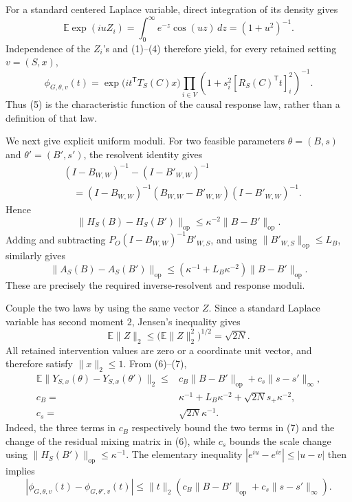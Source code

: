 For a standard centered Laplace variable, direct integration of its density
gives
\[
 \mathbb E\exp(iuZ_i)
 =\int_0^\infty e^{-z}\cos(uz)\,dz
 =(1+u^2)^{-1}.
\]
Independence of the \(Z_i\)'s and (1)--(4) therefore yield, for every retained
setting \(v=(S,x)\),
\[
 \phi_{G,\theta,v}(t)
 =\exp\!\bigl(i t^{\mathsf T}T_S(C)x\bigr)
   \prod_{i\in V}
   \left(1+s_i^2[R_S(C)^{\mathsf T}t]_i^2\right)^{-1}.
 \tag{5}
\]
Thus (5) is the characteristic function of the causal response law, rather
than a definition of that law.

We next give explicit uniform moduli.  For two feasible parameters
\(\theta=(B,s)\) and \(\theta'=(B',s')\), the resolvent identity gives
\[
 \begin{split}
 &(I-B_{W,W})^{-1}-(I-B'_{W,W})^{-1}\\
 &\quad=(I-B_{W,W})^{-1}(B_{W,W}-B'_{W,W})
          (I-B'_{W,W})^{-1}.
 \end{split}
\]
Hence
\[
 \lVert H_S(B)-H_S(B')\rVert_{\mathrm{op}}
 \leq\kappa^{-2}\lVert B-B'\rVert_{\mathrm{op}}.
 \tag{6}
\]
Adding and subtracting
\(P_O(I-B_{W,W})^{-1}B'_{W,S}\), and using
\(\lVert B'_{W,S}\rVert_{\mathrm{op}}\leq L_B\), similarly gives
\[
 \lVert A_S(B)-A_S(B')\rVert_{\mathrm{op}}
 \leq(\kappa^{-1}+L_B\kappa^{-2})
       \lVert B-B'\rVert_{\mathrm{op}}.
 \tag{7}
\]
These are precisely the required inverse-resolvent and response moduli.

Couple the two laws by using the same vector \(Z\).  Since a standard
Laplace variable has second moment \(2\), Jensen's inequality gives
\[
 \mathbb E\lVert Z\rVert_2
 \leq\bigl(\mathbb E\lVert Z\rVert_2^2\bigr)^{1/2}
 =\sqrt{2N}.
\]
All retained intervention values are zero or a coordinate unit vector, and
therefore satisfy \(\lVert x\rVert_2\leq1\).  From (6)--(7),
\[
 \begin{split}
 \mathbb E\lVert Y_{S,x}(\theta)-Y_{S,x}(\theta')\rVert_2
 \leq{}&c_B\lVert B-B'\rVert_{\mathrm{op}}
       +c_s\lVert s-s'\rVert_\infty,\\
 c_B={}&\kappa^{-1}+L_B\kappa^{-2}
          +\sqrt{2N}s_+\kappa^{-2},\\
 c_s={}&\sqrt{2N}\kappa^{-1}.
 \end{split}
 \tag{8}
\]
Indeed, the three terms in \(c_B\) respectively bound the two terms in
(7) and the change of the residual mixing matrix in (6), while \(c_s\)
bounds the scale change using
\(\lVert H_S(B')\rVert_{\mathrm{op}}\leq\kappa^{-1}\).
The elementary inequality \(|e^{iu}-e^{iv}|\leq|u-v|\) then implies
\[
 |\phi_{G,\theta,v}(t)-\phi_{G,\theta',v}(t)|
 \leq\lVert t\rVert_2
 \left(c_B\lVert B-B'\rVert_{\mathrm{op}}
       +c_s\lVert s-s'\rVert_\infty\right).
 \tag{9}
\]

